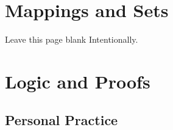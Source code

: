 \newpage
\chapter{Mappings and Sets}
Leave this page blank Intentionally.
\chapter{Logic and Proofs}
\section{Personal Practice}
\begin{bt} \end{bt}
\begin{bt} \end{bt}
\begin{bt} \end{bt}
\begin{bt} \end{bt}
\begin{bt} \end{bt}
\begin{bt} \end{bt}
\begin{bt} \end{bt}
\begin{bt} \end{bt}
\begin{bt} \end{bt}
\begin{bt} \end{bt}
\begin{bt} \end{bt}
\begin{bt} \end{bt}
\begin{bt} \end{bt}
\begin{bt} \end{bt}
\begin{bt} \end{bt}
\begin{bt} \end{bt}
\begin{bt} \end{bt}
\begin{bt} \end{bt}
\begin{bt} \end{bt}
\begin{bt} \end{bt}
